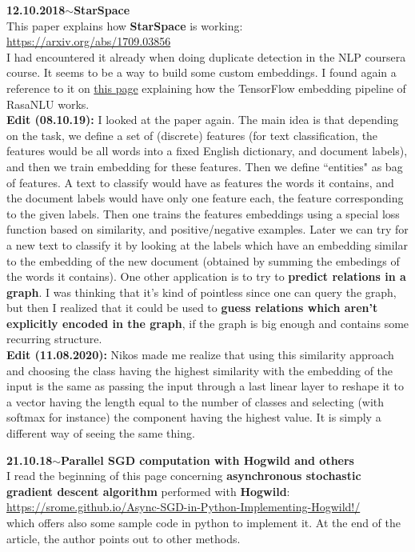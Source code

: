 \documentclass[11pt,a4paper]{article}
\newenvironment{loggentry}[2]%
{\noindent\textbf{#1}\hspace{1cm}$\mathbf{\sim}$\text{ }\textbf{#2}\\}{\vspace{0.5cm}}
\begin{document}
\begin{loggentry}{12.10.2018}{StarSpace}

This paper explains how \textbf{StarSpace} is working:\\
\url{https://arxiv.org/abs/1709.03856}\\
I had encountered it already when doing duplicate detection in the NLP coursera course. It seems to be a way to build some custom embeddings. I found again a reference to it on \href{https://medium.com/rasa-blog/supervised-word-vectors-from-scratch-in-rasa-nlu-6daf794efcd8}{this page} explaining how the TensorFlow embedding pipeline of RasaNLU works.\\
\textbf{Edit (08.10.19):} I looked at the paper again. The main idea is that depending on the task, we define a set of (discrete) features (for text classification, the features would be all words into a fixed English dictionary, and document labels), and then we train embedding for these features. Then we define ``entities" as bag of features. A text to classify would have as features the words it contains, and the document labels would have only one feature each, the feature corresponding to the given labels. Then one trains the features embeddings using a special loss function based on similarity, and positive/negative examples. Later we can try for a new text to classify it by looking at the labels which have an embedding similar to the embedding of the new document (obtained by summing the embedings of the words it contains). One other application is to try to \textbf{predict relations in a graph}. I was thinking that it's kind of pointless since one can query the graph, but then I realized that it could be used to \textbf{guess relations which aren't explicitly encoded in the graph}, if the graph is big enough and contains some recurring structure.\\

\textbf{Edit (11.08.2020):} Nikos made me realize that using this similarity approach and choosing the class having the highest similarity with the embedding of the input is the same as passing the input through a last linear layer to reshape it to a vector having the length equal to the number of classes and selecting (with softmax for instance) the component having the highest value. It is simply a different way of seeing the same thing.

\end{loggentry}

\begin{loggentry}{21.10.18}{Parallel SGD computation with Hogwild and others}

I read the beginning of this page concerning \textbf{asynchronous stochastic gradient descent algorithm} performed with \textbf{Hogwild}:\\
\url{https://srome.github.io/Async-SGD-in-Python-Implementing-Hogwild!/}\\
which offers also some sample code in python to implement it. At the end of the article, the author points out to other methods.\\

\end{loggentry}
\end{document}
